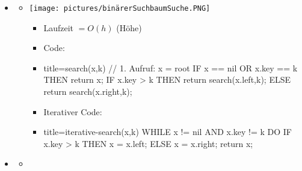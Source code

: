 \documentclass[
    12pt,
    a4paper,
    ngerman,
    color=3b,%
    marginpar=false,
    colorback=false,
    leqno,
]{tudaexercise}
\begin{document}
\begin{itemize}
    \item {}
          \begin{itemize}
              \item[]
                    \begin{minipage}{0.4\textwidth}
                        \texttt{[image: pictures/binärerSuchbaumSuche.PNG]}
                    \end{minipage}
                    \begin{minipage}{0.5\textwidth}
                        \begin{itemize}
                            \item Laufzeit $= O(h)$ (Höhe)
                            \item Code:
                            \item[]
                                  \begin{ccode}[autogobble]{title={search(x,k) // 1. Aufruf: x = root}}
                                      IF x == nil OR x.key == k THEN
                                        return x;
                                      IF x.key > k THEN
                                        return search(x.left,k);
                                      ELSE
                                        return search(x.right,k);
                                  \end{ccode}
                            \item Iterativer Code:
                            \item[]
                                  \begin{ccode}[autogobble]{title={iterative-search(x,k)}}
                                      WHILE x != nil AND x.key != k DO
                                        IF x.key > k THEN
                                            x = x.left;
                                        ELSE
                                            x = x.right;
                                      return x;
                                  \end{ccode}
                        \end{itemize}
                    \end{minipage}
          \end{itemize}
          \clearpage
    \item {}
          \begin{itemize}
              \item[]

\end{itemize}
\end{itemize}
\end{document}
